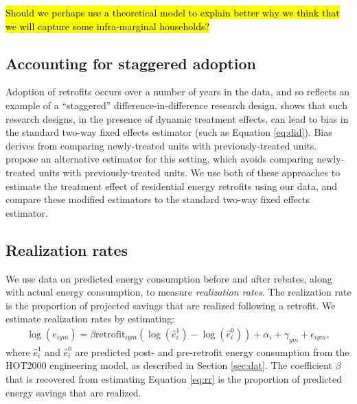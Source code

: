 \documentclass{article}
\newcommand{\hlc}[2][yellow]{ {\sethlcolor{#1} \hl{#2}} }
\begin{document}
\hlc{Should we perhaps use a theoretical model to explain better why we think that we will capture some infra-marginal households?}

\subsection{Accounting for staggered adoption}
Adoption of retrofits occurs over a number of years in the data, and so reflects an example of a ``staggered'' difference-in-difference research design. \cite{goodman2021difference} shows that such research designs, in the presence of dynamic treatment effects, can lead to bias in the standard two-way fixed effects estimator (such as Equation \eqref{eq:did}). Bias derives from comparing newly-treated units with previously-treated units. \cite{sun2021estimating} propose an alternative estimator for this setting, which avoids comparing newly-treated units with previously-treated units. We use both of these approaches to estimate the treatment effect of residential energy retrofits using our data, and compare these modified estimators to the standard two-way fixed effects estimator.
 
\subsection{Realization rates}\label{sec:rr_method}
We use data on predicted energy consumption before and after rebates, along with actual energy consumption, to measure \textit{realization rates}. The realization rate is the proportion of projected savings that are realized following a retrofit. We estimate realization rates by estimating:
\begin{align}
	\log(e_{iym}) = \beta \text{retrofit}_{iym} \left(\log(\hat{e}^1_i) - \log(\hat{e}^0_i) \right) + \alpha_i + \gamma_{ym} + \epsilon_{iym},
	\label{eq:rr}
\end{align} 
where $\hat{e}^1_i$ and $\hat{e}^0_i$ are predicted post- and pre-retrofit energy consumption from the HOT2000 engineering model, as described in Section \ref{sec:dat}. The coefficient $\beta$ that is recovered from estimating Equation \eqref{eq:rr} is the proportion of predicted energy savings that are realized.
\end{document}
